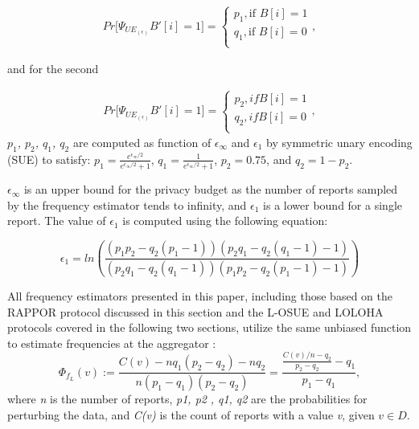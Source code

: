 \begin{align*}
Pr\bigr[\Psi_{UE_{(\epsilon)}}B'[i]=1] =
\begin{cases}
      p_1, \text{if } B[i] = 1 \\
      q_1, \text{if } B[i] = 0 \\
\end{cases},
\end{align*}


and for the second


\begin{align*}
Pr\bigr[\Psi_{UE_{(\epsilon)}}B'[i]=1] =
\begin{cases}
      p_2, if B[i] = 1\\
      q_2, if B[i] = 0\\
\end{cases},
\end{align*}
% 
\textit{$p_1$, $p_2$, $q_1$, $q_2$}  are computed as function of $\epsilon_{\infty}$ and $\epsilon_{1}$ by symmetric unary encoding (SUE) to satisfy: $p_1 = \frac{e^{\epsilon_{\infty}/2}}{e^{\epsilon_{\infty}/2} + 1}$, $q_1 = \frac{1}{e^{\epsilon_{\infty}/2} + 1}$, $p_2 = 0.75$, and $q_2=1-p_2$. 

% 
% 
$\epsilon_{\infty}$ is an upper bound for the privacy budget as the number of reports sampled by the frequency estimator tends to infinity, and $\epsilon_{1}$ is a lower bound for a single report. The value of $\epsilon_{1}$ is computed using the following equation:

\begin{equation}
\label{eq:eps1_ue}
\epsilon_1 = ln\left(\frac{(p_1p_2-q_2(p_1-1))(p_2q_1-q_2(q_1-1)-1)} {(p_2q_1-q_2(q_1-1))(p_1p_2-q_2(p_1-1)-1)}\right)
\end{equation}

All frequency estimators presented in this paper, including those based on the RAPPOR protocol discussed in this section and the L-OSUE and LOLOHA protocols covered in the following two sections, utilize the same unbiased function to estimate frequencies at the aggregator \citep{erlingsson2014rappor,arcolezi2022improving,arcolezi2022frequency}:  
% 
\begin{equation}
\label{eq:round2_est}
\Phi_{f_L}(v) := \frac{C(v) - nq_1(p_2-q_2) - nq_2}{n(p_1 - q_1)(p_2 - q_2)} = \frac{{\frac{C(v)/n - q_2}{p_2 - q_2}} - q_1}{p_1 - q_1},
\end{equation}
% 
where \textit{n} is the number of reports, \textit{p1, p2} \textit{, q1, q2} are the probabilities for perturbing the data, and \textit{C(v)} is the count of reports with a value \textit{v}, given $v \in D$. 


